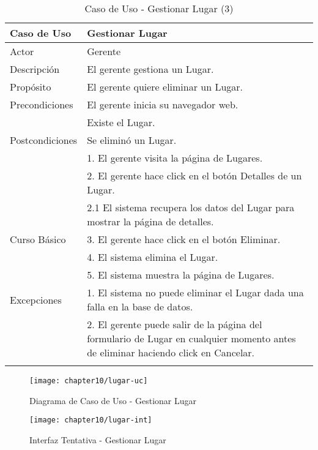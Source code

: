 \begin{longtable}{@{} p{3cm} p{10cm} @{}} \toprule
    \textbf{Caso de Uso}    & Gestionar Lugar \\ \midrule
    Actor                   & Gerente \\ \cmidrule{1-2}
    Descripción             & El gerente gestiona un Lugar. \\ \cmidrule{1-2}
    Propósito               & El gerente quiere eliminar un Lugar. \\ \cmidrule{1-2}
    Precondiciones          & El gerente inicia su navegador web. \\
                            & Existe el Lugar. \\ \cmidrule{1-2} 
    Postcondiciones         & Se eliminó un Lugar. \\ \cmidrule{1-2} 
                            & 1. El gerente visita la página de Lugares. \\ 
                            & 2. El gerente hace click en el botón Detalles de un Lugar. \\
                            & 2.1 El sistema recupera los datos del Lugar para mostrar la página de detalles. \\
    Curso Básico            & 3. El gerente hace click en el botón Eliminar. \\
                            & 4. El sistema elimina el Lugar. \\ 
                            & 5. El sistema muestra la página de Lugares. \\ \cmidrule{1-2}
    Excepciones             & 1. El sistema no puede eliminar el Lugar dada una falla en la base de datos. \\
                            & 2. El gerente puede salir de la página del formulario de Lugar en cualquier momento antes de eliminar haciendo click en Cancelar. \\ \bottomrule
   \caption{Caso de Uso - Gestionar Lugar (3)} \label{tab:tabcu-lug3} \\
   \end{longtable}

    \begin{figure}[H]
        \centering
        \texttt{[image: chapter10/lugar-uc]}
        \caption{Diagrama de Caso de Uso - Gestionar Lugar}
        \label{fig:lugar-uc}
    \end{figure}
    
    \begin{figure}[H]
        \centering
        \texttt{[image: chapter10/lugar-int]}
        \caption{Interfaz Tentativa - Gestionar Lugar}
        \label{fig:lugar-int}
    \end{figure}
    
